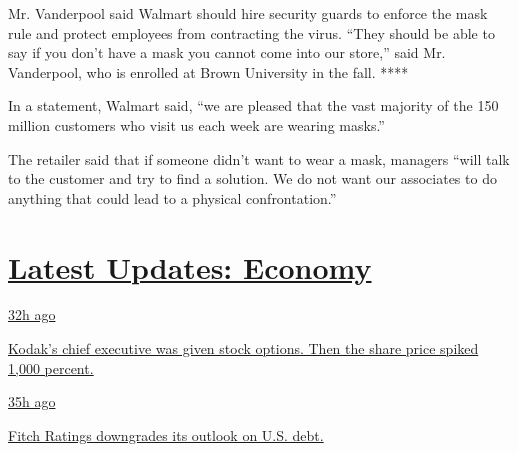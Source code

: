 Mr. Vanderpool said Walmart should hire security guards to enforce the
mask rule and protect employees from contracting the virus. ``They
should be able to say if you don't have a mask you cannot come into our
store,'' said Mr. Vanderpool, who is enrolled at Brown University in the
fall. ****

In a statement, Walmart said, ``we are pleased that the vast majority of
the 150 million customers who visit us each week are wearing masks.''

The retailer said that if someone didn't want to wear a mask, managers
``will talk to the customer and try to find a solution. We do not want
our associates to do anything that could lead to a physical
confrontation.''

\hypertarget{latest-updates-economy}{%
\section{\texorpdfstring{\href{https://www.nytimes3xbfgragh.onion/live/2020/07/31/business/stock-market-today-coronavirus?action=click\&pgtype=Article\&state=default\&region=MAIN_CONTENT_1\&context=storylines_live_updates}{Latest
Updates:
Economy}}{Latest Updates: Economy}}\label{latest-updates-economy}}

\href{https://www.nytimes3xbfgragh.onion/live/2020/07/31/business/stock-market-today-coronavirus?action=click\&pgtype=Article\&state=default\&region=MAIN_CONTENT_1\&context=storylines_live_updates\#kodaks-chief-executive-was-given-stock-options-then-the-share-price-spiked-1000-percent}{32h
ago}

\href{https://www.nytimes3xbfgragh.onion/live/2020/07/31/business/stock-market-today-coronavirus?action=click\&pgtype=Article\&state=default\&region=MAIN_CONTENT_1\&context=storylines_live_updates\#kodaks-chief-executive-was-given-stock-options-then-the-share-price-spiked-1000-percent}{Kodak's
chief executive was given stock options. Then the share price spiked
1,000 percent.}

\href{https://www.nytimes3xbfgragh.onion/live/2020/07/31/business/stock-market-today-coronavirus?action=click\&pgtype=Article\&state=default\&region=MAIN_CONTENT_1\&context=storylines_live_updates\#fitch-ratings-downgrades-its-outlook-on-us-debt}{35h
ago}

\href{https://www.nytimes3xbfgragh.onion/live/2020/07/31/business/stock-market-today-coronavirus?action=click\&pgtype=Article\&state=default\&region=MAIN_CONTENT_1\&context=storylines_live_updates\#fitch-ratings-downgrades-its-outlook-on-us-debt}{Fitch
Ratings downgrades its outlook on U.S. debt.}

